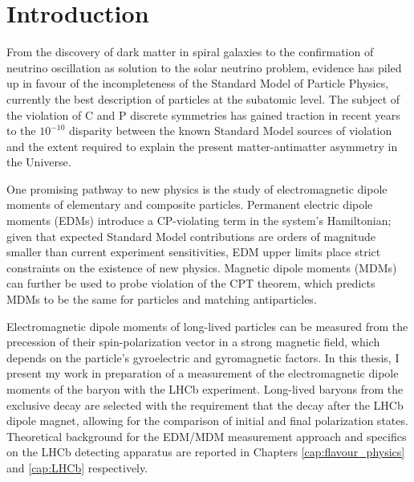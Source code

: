 \chapter*{Introduction}

%

From the discovery of dark matter in spiral galaxies to the confirmation of neutrino oscillation as solution to the solar neutrino problem, evidence has piled up in favour of the incompleteness of the Standard Model of Particle Physics, currently the best description of particles at the subatomic level.
The subject of the violation of C and P discrete symmetries has gained traction in recent years to the ${10}^{-10}$ disparity between the known Standard Model sources of violation and the extent required to explain the present matter-antimatter asymmetry in the Universe. 

One promising pathway to new physics is the study of electromagnetic dipole moments of elementary and composite particles.
Permanent electric dipole moments (EDMs) introduce a CP-violating term in the system's Hamiltonian;
given that expected Standard Model contributions are orders of magnitude smaller than current experiment sensitivities, EDM upper limits place strict constraints on the existence of new physics.
Magnetic dipole moments (MDMs) can further be used to probe violation of the CPT theorem, which predicts MDMs to be the same for particles and matching antiparticles.

Electromagnetic dipole moments of long-lived particles can be measured from the precession of their spin-polarization vector in a strong magnetic field, which depends on the particle's gyroelectric and gyromagnetic factors.
In this thesis, I present my work in preparation of a measurement of the electromagnetic dipole moments of the \lz baryon with the LHCb experiment.
Long-lived \lz baryons from the exclusive \demonstratorfull decay are selected with the requirement that the \lz decay after the LHCb dipole magnet, allowing for the comparison of initial and final polarization states.
Theoretical background for the EDM/MDM measurement approach and specifics on the LHCb detecting apparatus are reported in Chapters \ref{cap:flavour_physics} and \ref{cap:LHCb} respectively.


